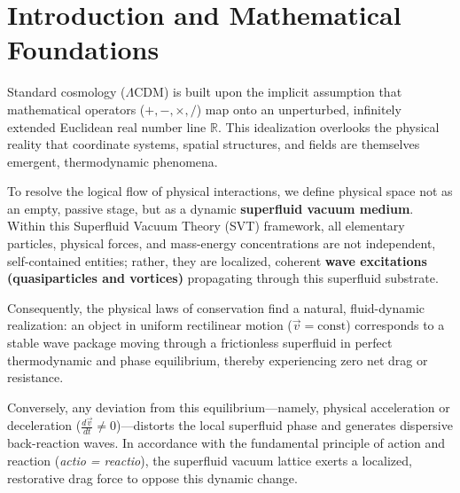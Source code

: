 \documentclass[11pt,a4paper]{article}
\theoremstyle{plain}
\theoremstyle{definition}
\theoremstyle{remark}
\begin{document}
\begin{abstract}
We demonstrate that the Hubble tension is resolved as a projection artifact of this density-modulated, self-reactive metric. By defining the fine-structure constant $\alpha$ as the direct measure of current spatial vacuum tension, we determine that with our present value of $\alpha \approx 1/137$, the universe is currently positioned at approximately $0.73\%$ of its total potential lifecycle. Finally, we derive the conditions for asymptotic terminal collapse, wherein an unresolved input-output imbalance drives the system to the absolute elastic limit $\alpha \to 1$. This instability triggers a runaway energy feedback loop that manifests as a catastrophic Hypernova detonation of the host 4D progenitor star, conforming strictly to the relativistic Collapsar frameworks established by Woosley and MacFadyen.
\end{abstract}

\newpage
\tableofcontents
\newpage

\section{Introduction and Mathematical Foundations}
Standard cosmology ($\Lambda$CDM) is built upon the implicit assumption that mathematical operators ($+, -, \times, /$) map onto an unperturbed, infinitely extended Euclidean real number line $\mathbb{R}$. This idealization overlooks the physical reality that coordinate systems, spatial structures, and fields are themselves emergent, thermodynamic phenomena. 

To resolve the logical flow of physical interactions, we define physical space not as an empty, passive stage, but as a dynamic \textbf{superfluid vacuum medium}. Within this Superfluid Vacuum Theory (SVT) framework, all elementary particles, physical forces, and mass-energy concentrations are not independent, self-contained entities; rather, they are localized, coherent \textbf{wave excitations (quasiparticles and vortices)} propagating through this superfluid substrate. 

Consequently, the physical laws of conservation find a natural, fluid-dynamic realization: an object in uniform rectilinear motion ($\vec{v} = \text{const}$) corresponds to a stable wave package moving through a frictionless superfluid in perfect thermodynamic and phase equilibrium, thereby experiencing zero net drag or resistance. 

Conversely, any deviation from this equilibrium—namely, physical acceleration or deceleration ($\frac{d\vec{v}}{dt} \neq 0$)—distorts the local superfluid phase and generates dispersive back-reaction waves. In accordance with the fundamental principle of action and reaction (\textit{actio = reactio}), the superfluid vacuum lattice exerts a localized, restorative drag force to oppose this dynamic change. 
\end{document}
